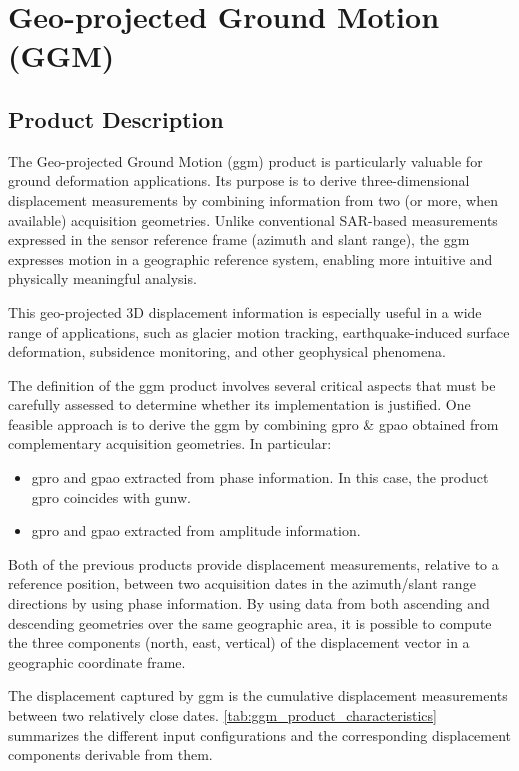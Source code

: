 \section{Geo-projected Ground Motion (GGM)}

\subsection{Product Description}
The Geo-projected Ground Motion (\acs{ggm}) product is particularly valuable for ground deformation applications. Its purpose is to derive three-dimensional displacement measurements by combining information from two (or more, when available) acquisition geometries. Unlike conventional SAR-based measurements expressed in the sensor reference frame (azimuth and slant range), the \acs{ggm} expresses motion in a geographic reference system, enabling more intuitive and physically meaningful analysis.

This geo-projected 3D displacement information is especially useful in a wide range of applications, such as glacier motion tracking, earthquake-induced surface deformation, subsidence monitoring, and other geophysical phenomena.

The definition of the \acs{ggm} product involves several critical aspects that must be carefully assessed to determine whether its implementation is justified. One feasible approach is to derive the \acs{ggm} by combining \acs{gpro} \& \acs{gpao} obtained from complementary acquisition geometries. In particular:

\begin{itemize}
    \item \acs{gpro} and \acs{gpao} extracted from phase information. In this case, the product \acs{gpro} coincides with \acs{gunw}. 
    \item \acs{gpro} and \acs{gpao} extracted from amplitude information. 
\end{itemize}
Both of the previous products provide displacement measurements, relative to a reference position, between two acquisition dates in the azimuth/slant range directions by using phase information. By using data from both ascending and descending geometries over the same geographic area, it is possible to compute the three components (north, east, vertical) of the displacement vector in a geographic coordinate frame.

The displacement captured by \acs{ggm} is the cumulative displacement measurements between two relatively close dates. \autoref{tab:ggm_product_characteristics} summarizes the different input configurations and the corresponding displacement components derivable from them.

